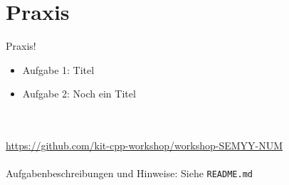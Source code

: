 \section{Praxis}
\begin{frame}[fragile]{Praxis!}
	\begin{itemize}
		\item Aufgabe 1: Titel
		\item Aufgabe 2: Noch ein Titel
	\end{itemize}
	\ \\
	\ \\
	\large{\url{https://github.com/kit-cpp-workshop/workshop-SEMYY-NUM}} \\
	\ \\
	Aufgabenbeschreibungen und Hinweise: Siehe \verb|README.md|

\end{frame}
